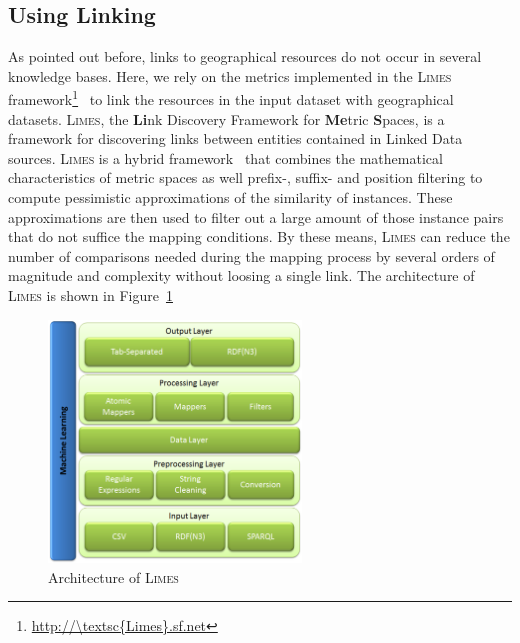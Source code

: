 \documentclass[a4paper,twoside,bibtotoc,abstracton,12pt,BCOR=15mm]{article}
\newcommand{\limes}{\textsc{Limes}\xspace}
\begin{document}
\subsection{Using Linking}
As pointed out before, links to geographical resources do not occur in several knowledge bases.
Here, we rely on the metrics implemented in the \limes framework\footnote{\url{http://\limes.sf.net}}~\cite{NGAU11,NGON12c,NGO+13c} to link the resources in the input dataset with geographical datasets.
\limes, the \textbf{Li}nk Discovery Framework for \textbf{Me}tric \textbf{S}paces, is a framework for discovering links between entities contained in Linked Data sources. \limes is a hybrid framework~\cite{NGON12c} that combines the mathematical characteristics of metric spaces as well prefix-, suffix- and position filtering to compute pessimistic approximations of the similarity of instances. These approximations are then used to filter out a large amount of those instance pairs that do not suffice the mapping conditions. By these means, \limes can reduce the number of comparisons needed during the mapping process by several orders of magnitude and complexity without loosing a single link.
The architecture of \limes is shown in Figure~\ref{fig:limesArchitecture}

\begin{figure}[ht!]
  \centering
  \includegraphics[width = 0.6\textwidth]{images/limesArchitecture.png}
  \caption{Architecture of \limes}
  \label{fig:limesArchitecture}
\end{figure}
		
\end{document}
